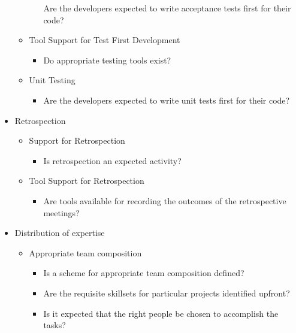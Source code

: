 \begin{appendices}
\begin{itemize}
\begin{itemize}
\begin{itemize}
					\addition Are the developers expected to write acceptance tests first for their code?
				\end{itemize}
		\end{itemize} 
		\begin{itemize}
			\item Tool Support for Test First Development
				\begin{itemize}
					\item Do appropriate testing tools exist?
				\end{itemize}
		\end{itemize}
		\begin{itemize}
			\item Unit Testing
				\begin{itemize}
					\item Are the developers expected to write unit tests first for their code?
				\end{itemize}
		\end{itemize}
	\item Retrospection
		\begin{itemize}
			\item Support for Retrospection
				\begin{itemize}
					\item Is retrospection an expected activity?
				\end{itemize}
		\end{itemize}
		\begin{itemize}
			\item Tool Support for Retrospection
				\begin{itemize}
					\item Are tools available for recording the outcomes of the retrospective meetings?
				\end{itemize}
		\end{itemize}
	\item Distribution of expertise
		\begin{itemize}
			\item Appropriate team composition
				\begin{itemize}
					\item Is a scheme for appropriate team composition defined?
					\item Are the requisite skillsets for particular projects identified upfront?
					\item Is it expected that the right people be chosen to accomplish the tasks?

\end{itemize}
\end{itemize}
\end{itemize}
\end{appendices}
